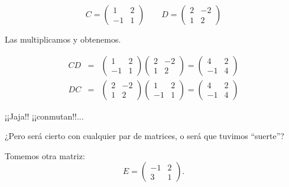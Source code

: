 \documentclass[12pt]{book}
\begin{document}
$$C=\left(\begin{array}{cc} 1 & 2\\ -1 & 1\end{array}\right)\qquad
  D=\left(\begin{array}{cc} 2 & -2\\ 1 & 2\end{array}\right)$$

 
    
Las multiplicamos y obtenemos.

\begin{eqnarray*}
  CD&=&\left(\begin{array}{cc} 1 & 2\\ -1 & 1\end{array}\right)
    \left(\begin{array}{cc} 2 & -2\\ 1 & 2\end{array}\right)=
    \left(\begin{array}{cc} 4 & 2\\ -1 & 4\end{array}\right)\\
      DC&=&\left(\begin{array}{cc} 2 & -2\\ 1 & 2\end{array}\right)
        \left(\begin{array}{cc} 1 & 2\\ -1 & 1\end{array}\right)=
    \left(\begin{array}{cc} 4 & 2\\ -1 & 4\end{array}\right)
\end{eqnarray*}

¡¡Jaja!! ¡¡conmutan!!...

¿Pero será cierto con cualquier par de matrices, o será que tuvimos ``suerte''?

Tomemos otra matriz: $$E=\left(\begin{array}{cc} -1 & 2\\ 3 & 1\end{array}\right).$$
\end{document}
